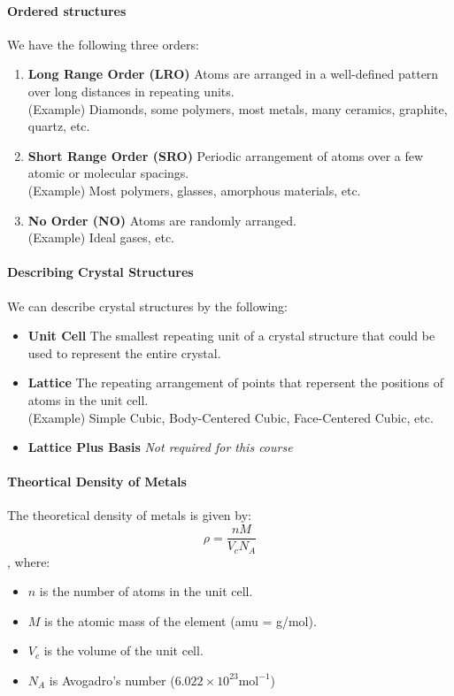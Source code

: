 \documentclass[11pt]{article}
\begin{document}
\paragraph{Ordered structures} We have the following three orders:
\begin{enumerate}
    \item \textbf{Long Range Order (LRO)} Atoms are arranged in a well-defined pattern over long distances in repeating units. \\
    (Example) Diamonds, some polymers, most metals, many ceramics, graphite, quartz, etc.
    \item \textbf{Short Range Order (SRO)} Periodic arrangement of atoms over a few atomic or molecular spacings. \\
    (Example) Most polymers, glasses, amorphous materials, etc.
    \item \textbf{No Order (NO)} Atoms are randomly arranged. \\
    (Example) Ideal gases, etc.
\end{enumerate}
\paragraph{Describing Crystal Structures} We can describe crystal structures by the following:
\begin{itemize}
    \item \textbf{Unit Cell} The smallest repeating unit of a crystal structure that could be used to represent the entire crystal.
    \item \textbf{Lattice} The repeating arrangement of points that repersent the positions of atoms in the unit cell.\\
    (Example) Simple Cubic, Body-Centered Cubic, Face-Centered Cubic, etc.
    \item \textbf{Lattice Plus Basis} \textit{Not required for this course}
\end{itemize}
\paragraph{Theortical Density of Metals} The theoretical density of metals is given by:
\begin{equation} \label{eq:theoretical-density}
    \rho = \frac{nM}{V_c N_A}
\end{equation}
, where:
\begin{itemize}
    \item $n$ is the number of atoms in the unit cell.
    \item $M$ is the atomic mass of the element (amu = g/mol).
    \item $V_c$ is the volume of the unit cell.
    \item $N_A$ is Avogadro's number ($6.022 \times 10^{23} \text{mol}^{-1}$)
\end{itemize}
\end{document}
